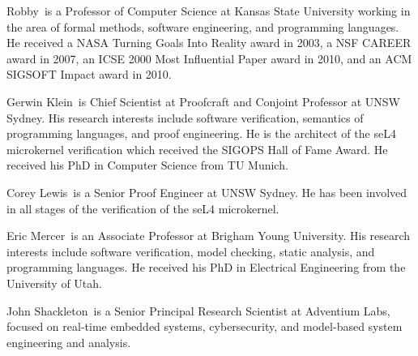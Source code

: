 \begin{IEEEbiography}{Robby}{\,}
is a Professor of Computer Science at Kansas State University working
in the area of formal methods, software engineering, and programming
languages.
He received a NASA Turning Goals Into Reality award in 2003,
a NSF CAREER award in 2007, an ICSE 2000 Most Influential Paper award in 2010,
and an ACM SIGSOFT Impact award in 2010.
\end{IEEEbiography}

\begin{IEEEbiography}{Gerwin Klein}{\,}
is Chief Scientist at Proofcraft and Conjoint Professor at UNSW Sydney. His
research interests include software verification, semantics of programming
languages, and proof engineering. He is the architect of the seL4 microkernel
verification which received the SIGOPS Hall of Fame Award. He received his PhD
in Computer Science from TU Munich.
\end{IEEEbiography}

\begin{IEEEbiography}{Corey Lewis}{\,}%
  is a Senior Proof Engineer at UNSW Sydney. He has been involved in all stages
  of the verification of the seL4 microkernel.
\end{IEEEbiography}

\begin{IEEEbiography}{Eric Mercer}{\,}
  is an Associate Professor at Brigham Young University.
  His research interests include software verification, model checking, static analysis, and programming languages.
  He received his PhD in Electrical Engineering from the University of Utah.
\end{IEEEbiography}

\begin{IEEEbiography}{John Shackleton}{\,}
  is a Senior Principal Research Scientist at Adventium Labs,
  focused on real-time embedded systems, cybersecurity, and
  model-based system engineering and analysis.
\end{IEEEbiography}

